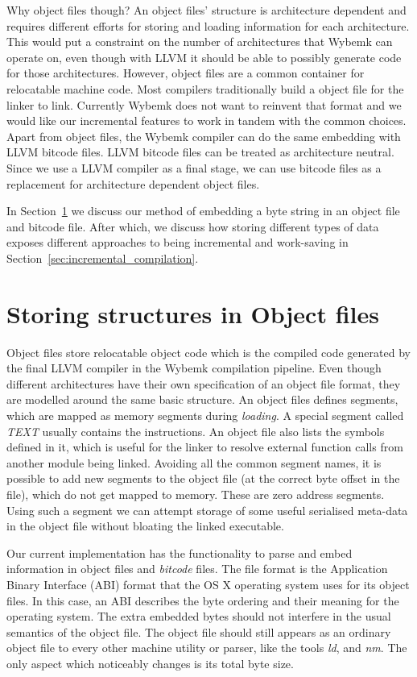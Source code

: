 Why object files though? An object files' structure is architecture dependent
and requires different efforts for storing and loading information for each
architecture. This would put a constraint on the number of architectures that
Wybemk can operate on, even though with LLVM it should be able to possibly
generate code for those architectures. However, object files are a common
container for relocatable machine code. Most compilers traditionally build a
object file for the linker to link. Currently Wybemk does not want to reinvent
that format and we would like our incremental features to work in tandem with
the common choices. Apart from object files, the Wybemk compiler can do the
same embedding with LLVM bitcode files. LLVM bitcode files can be treated as
architecture neutral. Since we use a LLVM compiler as a final stage, we can use
bitcode files as a replacement for architecture dependent object files.


In Section~\ref{sec:storage_obj} we discuss our method of embedding a byte
string in an object file and bitcode file. After which, we discuss how storing
different types of data exposes different approaches to being incremental and
work-saving in Section~\ref{sec:incremental_compilation}.

\section{Storing structures in Object files}
\label{sec:storage_obj}

Object files store relocatable object code which is the compiled code generated
by the final LLVM compiler in the Wybemk compilation pipeline. Even though
different architectures have their own specification of an object file format,
they are modelled around the same basic structure. An object files defines
segments, which are mapped as memory segments during \textit{loading}. A
special segment called \textit{TEXT} usually contains the instructions. An
object file also lists the symbols defined in it, which is useful for the
linker to resolve external function calls from another module being
linked. Avoiding all the common segment names, it is possible to add new
segments to the object file (at the correct byte offset in the file), which do
not get mapped to memory. These are zero address segments. Using such a segment
we can attempt storage of some useful serialised meta-data in the object file
without bloating the linked executable.

Our current implementation has the functionality to parse and embed information
in \macho object files and \textit{bitcode} files. The \macho file format is
the Application Binary Interface (ABI) format that the OS X operating system
uses for its object files. In this case, an ABI describes the byte ordering and
their meaning for the operating system. The extra embedded bytes should not
interfere in the usual semantics of the object file. The object file should
still appears as an ordinary object file to every other machine utility or
parser, like the tools \textit{ld}, and \textit{nm}. The only aspect which
noticeably changes is its total byte size.

